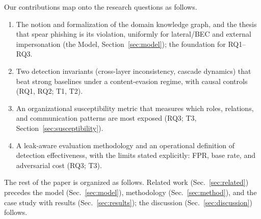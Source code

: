 Our contributions map onto the research questions as follows.
\begin{enumerate}[noitemsep,topsep=2pt]
  \item The notion and formalization of the domain knowledge graph, and the thesis that spear phishing is its
  violation, uniformly for lateral/BEC and external impersonation (the Model, Section~\ref{sec:model}); the
  foundation for RQ1--RQ3.
  \item Two detection invariants (cross-layer inconsistency, cascade dynamics) that beat strong baselines under a
  content-evasion regime, with causal controls (RQ1, RQ2; T1, T2).
  \item An organizational susceptibility metric that measures which roles, relations, and communication patterns
  are most exposed (RQ3; T3, Section~\ref{sec:susceptibility}).
  \item A leak-aware evaluation methodology and an operational definition of detection effectiveness, with the
  limits stated explicitly: FPR, base rate, and adversarial cost (RQ3; T3).
\end{enumerate}

The rest of the paper is organized as follows. Related work (Sec.~\ref{sec:related}) precedes the model
(Sec.~\ref{sec:model}), methodology (Sec.~\ref{sec:method}), and the case study with results
(Sec.~\ref{sec:results}); the discussion (Sec.~\ref{sec:discussion}) follows.
